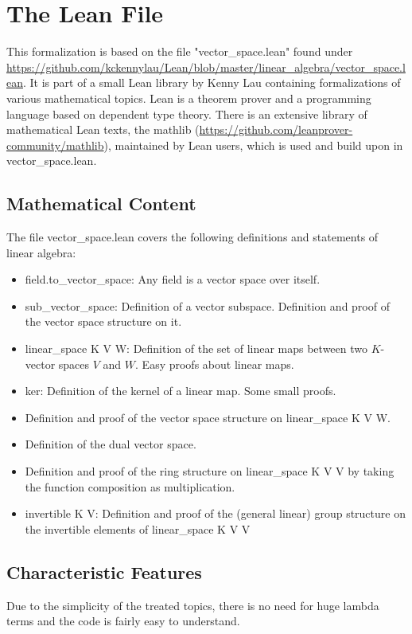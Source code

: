 \documentclass[11pt]{article}
\begin{document}
\newpage
\lstset{style=lean}
\section{The Lean File}
This formalization is based on the file "vector\_space.lean" found under \url{https://github.com/kckennylau/Lean/blob/master/linear_algebra/vector_space.lean}. It is part of a small Lean library by Kenny Lau containing formalizations of various mathematical topics.
Lean is a theorem prover and a programming language based on dependent type theory.
There is an extensive library of mathematical Lean texts, the mathlib (\url{https://github.com/leanprover-community/mathlib}), maintained by Lean users, which is used and build upon in vector\_space.lean.



\subsection{Mathematical Content} \label{mathematicalContent}
The file vector\_space.lean covers the following definitions and statements of linear algebra:
\begin{itemize}
\item {\lean field.to\_vector\_space}: Any field is a vector space over itself.
\item {\lean sub\_vector\_space}: Definition of a vector subspace. Definition and proof of the vector space structure on it.
\item {\lean linear\_space K V W}: Definition of the set of linear maps between two $K$-vector spaces $V$ and $W$. Easy proofs about linear maps.
\item {\lean ker}: Definition of the kernel of a linear map. Some small proofs.
\item Definition and proof of the vector space structure on {\lean linear\_space K V W}.
\item Definition of the dual vector space.
\item Definition and proof of the ring structure on {\lean linear\_space K V V} by taking the function composition as multiplication.
\item {\lean invertible K V}: Definition and proof of the (general linear) group structure on the invertible elements of {\lean linear\_space K V V}
\end{itemize}


%
\subsection{Characteristic Features} \label{characteristics}
Due to the simplicity of the treated topics, there is no need for huge lambda terms and the code is fairly easy to understand.
\end{document}
